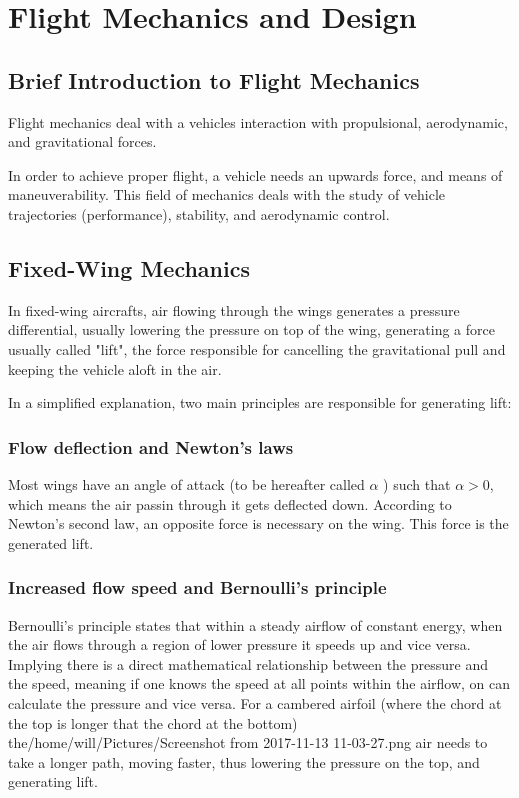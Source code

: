 
\chapter{Flight Mechanics and Design} \label{chap:4}

\section{Brief Introduction to Flight Mechanics}

Flight mechanics deal with a vehicles interaction with propulsional, aerodynamic, and gravitational forces.

In order to achieve proper flight, a vehicle needs an upwards force, and means of maneuverability. 
%
This field of mechanics deals with the study of vehicle trajectories (performance), stability, and aerodynamic
control.


\section{Fixed-Wing Mechanics}

In fixed-wing aircrafts, air flowing through the wings generates a pressure differential, usually lowering the pressure on top of the wing, generating a force usually called "lift", the force responsible for cancelling the gravitational pull and keeping the vehicle aloft in the air.

In a simplified explanation, two main principles are responsible for generating lift:

\subsection{Flow deflection and Newton's laws}

Most wings have an angle of attack (to be hereafter called $\alpha$ ) such that $\alpha > 0$, which means the air passin through it gets deflected down. According to Newton's second law, an opposite force is necessary on the wing. This force is the generated lift.

\subsection{Increased flow speed and Bernoulli's principle}

Bernoulli's principle states that within a steady airflow of constant energy, when the air flows through a region of lower pressure it speeds up and vice versa. Implying there is a direct mathematical relationship between the pressure and the speed, meaning if one knows the speed at all points within the airflow, on can calculate the pressure and vice versa. For a cambered airfoil (where the chord at the top is longer that the chord at the bottom) the/home/will/Pictures/Screenshot from 2017-11-13 11-03-27.png air needs to take a longer path, moving faster, thus lowering the pressure on the top, and generating lift.


